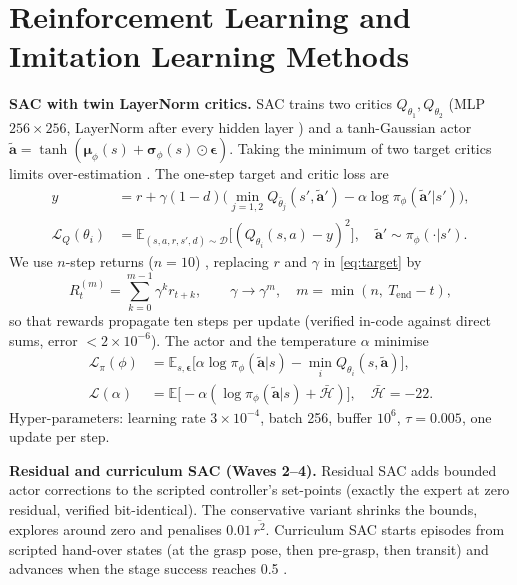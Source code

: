 \documentclass[conference,10pt]{IEEEtran}
\begin{document}
\section{Reinforcement Learning and Imitation Learning Methods}\label{sec:methods}
\textbf{SAC with twin LayerNorm critics.} SAC \cite{haarnoja2018sac} trains two critics $Q_{\theta_1},Q_{\theta_2}$ (MLP
$256\times256$, LayerNorm after every hidden layer \cite{ba2016layernorm}) and a tanh-Gaussian actor
$\tilde{\bm a}=\tanh(\bm\mu_\phi(s)+\bm\sigma_\phi(s)\odot\bm\epsilon)$. Taking the minimum of two target critics limits
over-estimation \cite{fujimoto2018td3}. The one-step target and critic loss are
\begin{align}
y&=r+\gamma(1-d)\Big(\min_{j=1,2}Q_{\bar\theta_j}(s',\tilde{\bm a}')-\alpha\log\pi_\phi(\tilde{\bm a}'|s')\Big),\label{eq:target}\\
\mathcal L_Q(\theta_i)&=\mathbb E_{(s,a,r,s',d)\sim\mathcal D}\big[(Q_{\theta_i}(s,a)-y)^2\big],\quad \tilde{\bm a}'\sim\pi_\phi(\cdot|s').
\end{align}
We use $n$-step returns ($n=10$) \cite{sutton2018rl}, replacing $r$ and $\gamma$ in \eqref{eq:target} by
\begin{equation}
R^{(m)}_t=\sum_{k=0}^{m-1}\gamma^{k}r_{t+k},\qquad \gamma\rightarrow\gamma^{m},\quad m=\min(n,\ T_{\text{end}}-t),\label{eq:nstep}
\end{equation}
so that rewards propagate ten steps per update (verified in-code against direct sums, error $<2\times10^{-6}$). The actor and
the temperature $\alpha$ minimise
\begin{align}
\mathcal L_\pi(\phi)&=\mathbb E_{s,\bm\epsilon}\Big[\alpha\log\pi_\phi(\tilde{\bm a}|s)-\min_{i}Q_{\theta_i}(s,\tilde{\bm a})\Big],\\
\mathcal L(\alpha)&=\mathbb E\big[-\alpha\left(\log\pi_\phi(\tilde{\bm a}|s)+\bar{\mathcal H}\right)\big],\quad \bar{\mathcal H}=-22.
\end{align}
Hyper-parameters: learning rate $3\times10^{-4}$, batch 256, buffer $10^6$, $\tau=0.005$, one update per step.

\textbf{Residual and curriculum SAC (Waves 2--4).} Residual SAC adds bounded actor corrections to the scripted controller's
set-points (exactly the expert at zero residual, verified bit-identical). The conservative variant shrinks the bounds,
explores around zero and penalises $0.01\,\overline{r^2}$. Curriculum SAC starts episodes from scripted hand-over states
(at the grasp pose, then pre-grasp, then transit) and advances when the stage success reaches 0.5 \cite{bengio2009curriculum}.
\end{document}
